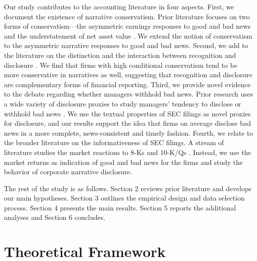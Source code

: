 \documentclass[letterpaper,11pt]{article}
\begin{document}
\begin{spacing}{1.5}
Our study contributes to the accounting literature in four aspects. First, we document the existence of narrative conservatism. Prior literature focuses on two forms of conservatism---the asymmetric earnings responses to good and bad news and the understatement of net asset value \cite{basuConservatismPrincipleAsymmetric1997, ballEarningsQualityUK2005, beaverConditionalUnconditionalConservatism2005}. We extend the notion of conservatism to the asymmetric narrative responses to good and bad news. Second, we add to the literature on the distinction and the interaction between recognition and disclosure \cite{aboodyRecognitionDisclosureOil1996, barthMarketEffectsRecognition2003, schipperRequiredDisclosuresFinancial2007}. We find that firms with high conditional conservatism tend to be more conservative in narratives as well, suggesting that recognition and disclosure are complementary forms of financial reporting. Third, we provide novel evidence to the debate regarding whether managers withhold bad news. Prior research uses a wide variety of disclosure proxies to study managers' tendency to disclose or withhold bad news \cite{kasznikWarnNotWarn1995, kothariManagersWithholdBad2009, baoManagersDiscloseWithhold2019}. We use the textual properties of SEC filings as novel proxies for disclosure, and our results support the idea that firms on average disclose bad news in a more complete, news-consistent and timely fashion. Fourth, we relate to the broader literature on the informativeness of SEC filings. A stream of literature studies the market reactions to 8-Ks \cite{carterRelevanceForm8K1999, pinskerHasFirmsForm2006, lermanNewForm8K2010} and 10-K/Qs \cite{alfordExtensionsViolationsStatutory1994, liAnnualReportReadability2008, liInformationContentForwardLooking2010}. Instead, we use the market returns as indication of good and bad news for the firms and study the behavior of corporate narrative disclosure.

The rest of the study is as follows. Section 2 reviews prior literature and develops our main hypotheses. Section 3 outlines the empirical design and data selection process. Section 4 presents the main results. Section 5 reports the additional analyses and Section 6 concludes.

\section{Theoretical Framework}

\end{spacing}
\end{document}
